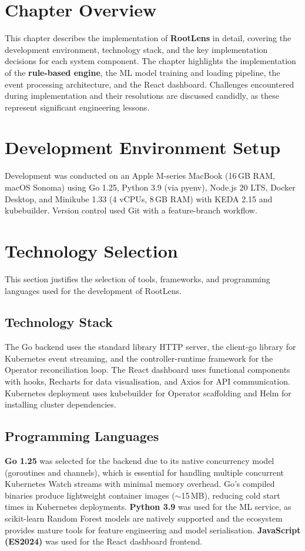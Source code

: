 
\section{Chapter Overview}
This chapter describes the implementation of \textbf{RootLens} in detail, covering the development environment, technology stack, and the key implementation decisions for each system component. The chapter highlights the implementation of the \textbf{rule-based engine}, the ML model training and loading pipeline, the event processing architecture, and the React dashboard. Challenges encountered during implementation and their resolutions are discussed candidly, as these represent significant engineering lessons.

\section{Development Environment Setup}
Development was conducted on an Apple M-series MacBook (16\,GB RAM, macOS Sonoma) using Go 1.25, Python 3.9 (via pyenv), Node.js 20 LTS, Docker Desktop, and Minikube 1.33 (4 vCPUs, 8\,GB RAM) with KEDA 2.15 and kubebuilder. Version control used Git with a feature-branch workflow.

\section{Technology Selection}
This section justifies the selection of tools, frameworks, and programming languages used for the development of RootLens.

\subsection{Technology Stack}
The Go backend uses the standard library HTTP server, the client-go library for Kubernetes event streaming, and the controller-runtime framework for the Operator reconciliation loop. The React dashboard uses functional components with hooks, Recharts for data visualisation, and Axios for API communication. Kubernetes deployment uses kubebuilder for Operator scaffolding and Helm for installing cluster dependencies.

\subsection{Programming Languages}
\textbf{Go 1.25} was selected for the backend due to its native concurrency model (goroutines and channels), which is essential for handling multiple concurrent Kubernetes Watch streams with minimal memory overhead. Go's compiled binaries produce lightweight container images ($\sim$15\,MB), reducing cold start times in Kubernetes deployments. \textbf{Python 3.9} was used for the ML service, as scikit-learn Random Forest models are natively supported and the ecosystem provides mature tools for feature engineering and model serialisation. \textbf{JavaScript (ES2024)} was used for the React dashboard frontend.

